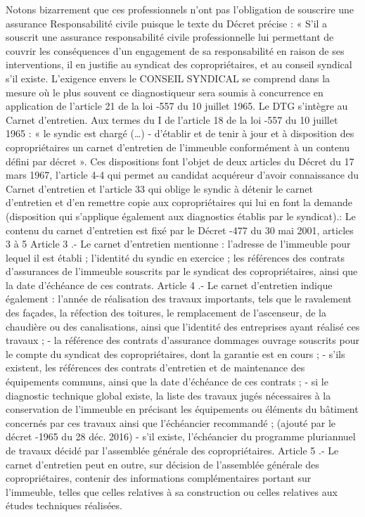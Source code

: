 		Notons bizarrement que ces professionnels n’ont pas l’obligation de souscrire une assurance Responsabilité civile puisque le texte du Décret précise : « S'il a souscrit une assurance responsabilité civile professionnelle lui permettant de couvrir les conséquences d'un engagement de sa responsabilité en raison de ses interventions, il en justifie au syndicat des copropriétaires, et au conseil syndical s'il existe.
		L’exigence envers le CONSEIL SYNDICAL se comprend dans la mesure où le plus souvent ce diagnostiqueur sera soumis à concurrence en application de l’article 21 de la loi -557 du 10 juillet 1965.
		Le DTG s’intègre au Carnet d’entretien.
		Aux termes du I de l’article 18 de la loi -557 du 10 juillet 1965 : « le syndic est chargé (…) - d’établir et de tenir à jour et à disposition des copropriétaires un carnet d’entretien de l’immeuble conformément à un contenu défini par décret ».
		Ces dispositions font l’objet de deux articles du Décret du 17 mars 1967, l’article 4-4 qui permet au candidat acquéreur d’avoir connaissance du Carnet d’entretien et l’article 33 qui oblige le syndic à détenir le carnet d’entretien et d’en remettre copie aux copropriétaires qui lui en font la demande (disposition qui s’applique également aux diagnostics établis par le syndicat).:
		Le contenu du carnet d’entretien est fixé par le Décret -477 du 30 mai 2001, articles 3 à 5
		Article 3 .- Le carnet d'entretien mentionne :
		l'adresse de l'immeuble pour lequel il est établi ;
		l'identité du syndic en exercice ;
		les références des contrats d'assurances de l'immeuble souscrits par le syndicat des copropriétaires, ainsi que la date d'échéance de ces contrats.
		Article 4 .- Le carnet d'entretien indique également :
		l'année de réalisation des travaux importants, tels que le ravalement des façades, la réfection des toitures, le remplacement de l'ascenseur, de la chaudière ou des canalisations, ainsi que l'identité des entreprises ayant réalisé ces travaux ;
		- la référence des contrats d'assurance dommages ouvrage souscrits pour le compte du syndicat des copropriétaires, dont la garantie est en cours ;
		- s'ils existent, les références des contrats d'entretien et de maintenance des équipements communs, ainsi que la date d'échéance de ces contrats ;
		- si le diagnostic technique global existe, la liste des travaux jugés nécessaires à la conservation de l'immeuble en précisant les équipements ou éléments du bâtiment concernés par ces travaux ainsi que l'échéancier recommandé ; (ajouté par le décret -1965 du 28 déc. 2016)
		- s'il existe, l'échéancier du programme pluriannuel de travaux décidé par l'assemblée générale des copropriétaires.
		Article 5 .- Le carnet d'entretien peut en outre, sur décision de l'assemblée générale des copropriétaires, contenir des informations complémentaires portant sur l'immeuble, telles que celles relatives à sa construction ou celles relatives aux études techniques réalisées.
		
